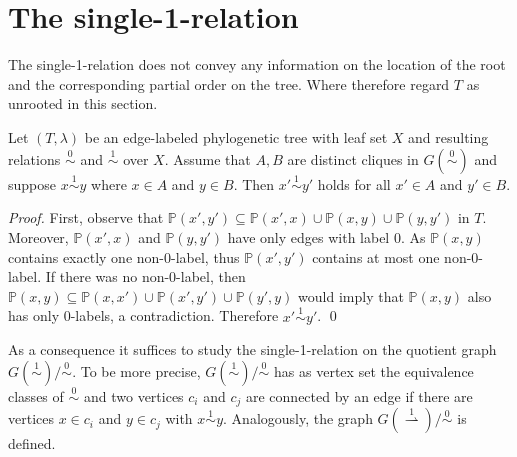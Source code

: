 \documentclass[smallextended]{svjour3}
\newcommand{\rev}[1]{\begingroup\color{blue}#1\endgroup}
\newcommand{\Ro}{\mathrel{\overset{0}{\sim}}}
\newcommand{\Rl}{\mathrel{\overset{1}{\sim}}}
\newcommand{\Rld}{\mathrel{\overset{1}{\rightharpoonup}}}
\begin{document}
\section{The single-1-relation}
\label{sect:single1}

The single-1-relation does not convey any information on the location of
the root and the corresponding partial order on the tree. Where therefore
regard $T$ as unrooted in this section.

\begin{lemma}
  \label{lem:notriangle}
  Let $(T,\lambda)$ be an edge-labeled \rev{phylogenetic tree with leaf set
    $X$ and} resulting relations $\Ro$ and $\Rl$ over $X$.  Assume that
  $A,B$ are distinct cliques in $G(\Ro)$ and suppose $x\Rl y$ where $x\in
  A$ and $y\in B$. Then $x'\Rl y'$ holds for all $x'\in A$ and $y'\in B$.
\end{lemma}
\begin{proof}
  First, observe that $\mathbb{P}(x',y') \subseteq
  \mathbb{P}(x',x)\cup \mathbb{P}(x,y)\cup \mathbb{P}(y,y')$ in $T$. 
  Moreover,  $\mathbb{P}(x',x)$ and $\mathbb{P}(y,y')$ have only edges with 
  label $0$. As $\mathbb{P}(x,y)$ contains exactly one non-0-label, thus 
  $\mathbb{P}(x',y')$ contains at most one non-0-label. If there was 
  no non-0-label, then $\mathbb{P}(x,y) \subseteq
  \mathbb{P}(x,x')\cup \mathbb{P}(x',y')\cup \mathbb{P}(y',y)$ would imply 
  that $\mathbb{P}(x,y)$ also has only 0-labels, a contradiction. Therefore 
  $x'\Rl y'$. \qed
\end{proof}

As a consequence it suffices to study the single-1-relation on the quotient
graph $G(\Rl)/\Ro$. To be more precise, $G(\Rl)/\Ro$ has as vertex set the
equivalence classes of $\Ro$ and two vertices $c_i$ and $c_j$ are connected
by an edge if there are vertices $x\in c_i$ and $y\in c_j$ with $x\Rl
y$. Analogously, the graph $G(\Rld)/\Ro$ is defined.
\end{document}
